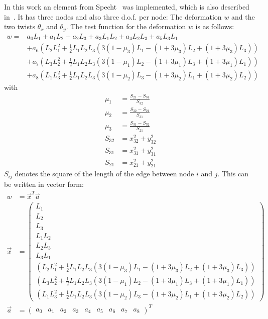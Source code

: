   In this work an element from Specht~\cite{specht1988modified} was implemented, which is also described in~\cite{steinke2005finite}. It has three nodes and also three d.o.f. per node: The deformation $w$ and the two twists $\theta_x$ and $\theta_y$. The test function for the deformation $w$ is as follows:
  \begin{align}
  w = &a_0 L_1 + a_1 L_2 + a_2 L_3 + a_3 L_1L_2 + a_4 L_2L_3 + a_5 L_3L_1 \nonumber\\
    & + a_6\left(L_2L_1^2 + \frac{1}{2}L_1L_2L_3 \left(3(1-\mu_3)L_1 - (1+3\mu_3)L_2 + (1+3\mu_3)L_3\right)\right) \nonumber\\
    & + a_7\left(L_3L_2^2 + \frac{1}{2}L_1L_2L_3 \left(3(1-\mu_1)L_2 - (1+3\mu_1)L_3 + (1+3\mu_1)L_1\right)\right) \nonumber\\
    & + a_8\left(L_1L_3^2 + \frac{1}{2}L_1L_2L_3 \left(3(1-\mu_2)L_3 - (1+3\mu_2)L_1 + (1+3\mu_2)L_2\right)\right)
  \end{align}
  with
  \begin{align}
  \mu_1 &= \frac{S_{21} - S_{31}}{S_{32}} \nonumber\\
  \mu_2 &= \frac{S_{32} - S_{21}}{S_{31}} \nonumber\\
  \mu_3 &= \frac{S_{31} - S_{32}}{S_{21}} \\
  S_{32} &= x_{32}^2 + y_{32}^2 \nonumber\\
  S_{31} &= x_{31}^2 + y_{31}^2 \nonumber\\
  S_{21} &= x_{21}^2 + y_{21}^2
  \end{align}
  $S_{ij}$ denotes the square of the length of the edge between node $i$ and $j$.
  This can be written in vector form:
  \begin{align}\label{eq:platet3w=x*a}
  w &= \vec{x}^T \vec{a} \nonumber\\
  \vec{x} &= \begin{pmatrix}
  L_1 \\ L_2 \\ L_3 \\ L_1L_2 \\ L_2L_3 \\ L_3L_1\\
  \left(L_2L_1^2+\frac{1}{2}L_1L_2L_3\left(3(1-\mu_3)L_1-(1+3\mu_3)L_2+(1+3\mu_3)L_3\right)\right)\\
  \left(L_3L_2^2+\frac{1}{2}L_1L_2L_3\left(3(1-\mu_1)L_2-(1+3\mu_1)L_3+(1+3\mu_1)L_1\right)\right)\\
  \left(L_1L_3^2+\frac{1}{2}L_1L_2L_3\left(3(1-\mu_2)L_3-(1+3\mu_2)L_1+(1+3\mu_2)L_2\right)\right)
  \end{pmatrix} \nonumber\\
  \vec{a} &= \begin{pmatrix}
  a_0 & a_1 & a_2 & a_3 & a_4 & a_5 & a_6 & a_7 & a_8
  \end{pmatrix}^T
  \end{align}
  
